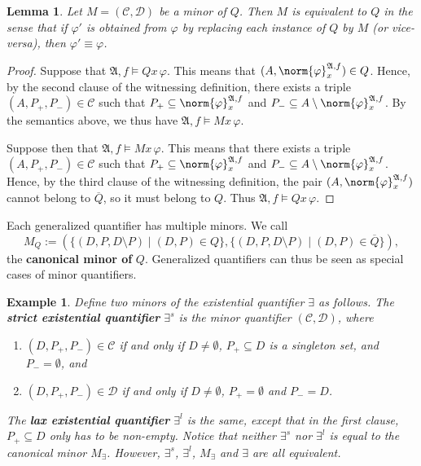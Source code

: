 \documentclass{article}
\newtheorem{lemma}[theorem]{Lemma}
\newtheorem{example}[theorem]{Example}
\theoremstyle{definition}
\begin{document}
\begin{lemma}\label{lem:minor-equivalent}
    Let $M=(\mathcal{C},\mathcal{D})$ be a minor of $Q$. Then $M$ is equivalent to $Q$ in the sense that if $\varphi'$ is obtained from $\varphi$ by replacing each instance of $Q$ by $M$ (or vice-versa), then $\varphi'\equiv\varphi$.
\end{lemma}
\begin{proof}
    Suppose that $\mathfrak{A},f\models Qx\, \varphi$. This means that $(A,\norm{\varphi}^{\mathfrak{A},f}_x)\in Q$. Hence, by the second clause of the witnessing definition, there exists a triple $(A,P_+,P_-)\in \mathcal{C}$ such that $P_+\subseteq \norm{\varphi}^{\mathfrak{A},f}_{x}$ and $P_-\subseteq A\setminus \norm{\varphi}^{\mathfrak{A},f}_{x}$. By the semantics above, we thus have $\mathfrak{A},f\models Mx\, \varphi$.

    Suppose then that $\mathfrak{A},f\models Mx\,\varphi$. This means that there exists a triple $(A,P_+,P_-)\in \mathcal{C}$ such that $P_+\subseteq \norm{\varphi}^{\mathfrak{A},f}_{x}$ and $P_-\subseteq A\setminus \norm{\varphi}^{\mathfrak{A},f}_{x}$. Hence, by the third clause of the witnessing definition, the pair $(A,\norm{\varphi}^{\mathfrak{A},f}_{x})$ cannot belong to $\overline{Q}$, so it must belong to $Q$. Thus $\mathfrak{A},f\models Qx\,\varphi$.
\end{proof}

Each generalized quantifier has multiple minors. We call
\[
    M_Q:=(\{(D,P,D\setminus P)\mid (D,P)\in Q\},\{(D,P,D\setminus P)\mid (D,P)\in\overline{Q}\}),
\]
the \textbf{canonical minor of} $Q$. Generalized quantifiers can thus be seen as special cases of minor quantifiers.

\begin{example}
    Define two minors of the existential quantifier $\exists$ as follows. The \textbf{strict existential quantifier} $\exists^s$ is the minor quantifier $(\mathcal{C},\mathcal{D})$, where
    \begin{enumerate}
        \item $(D,P_+,P_-)\in \mathcal{C}$ if and only if $D\neq\emptyset$, $P_+\subseteq D$ is a singleton set, and $P_-=\emptyset$, and
        \item $(D,P_+,P_-)\in\mathcal{D}$ if and only if $D\neq\emptyset$, $P_+=\emptyset$ and $P_-=D$.
    \end{enumerate}    
    The \textbf{lax existential quantifier} $\exists^l$ is the same, except that in the first clause, $P_+\subseteq D$ only has to be non-empty. Notice that neither $\exists^s$ nor $\exists^l$ is equal to the canonical minor $M_\exists$. However, $\exists^s$, $\exists^l$, $M_\exists$ and $\exists$ are all equivalent.
\end{example}
\end{document}
